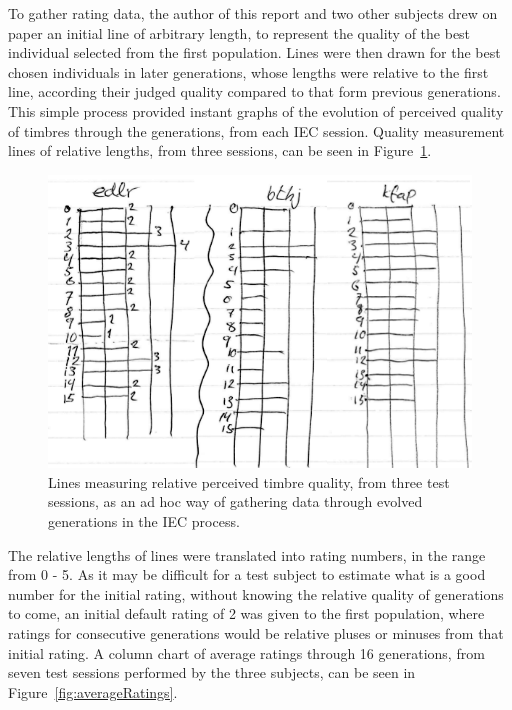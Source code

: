 \documentclass[conference]{IEEEtran}
\begin{document}
To gather rating data, the author of this report and two other subjects drew on paper an initial line of arbitrary length, to represent the quality of the best individual selected from the first population.  Lines were then drawn for the best chosen individuals in later generations, whose lengths were relative to the first line, according their judged quality compared to that form previous generations.  This simple process provided instant graphs of the evolution of perceived quality of timbres through the generations, from each IEC session.  Quality measurement lines of relative lengths, from three sessions, can be seen in Figure~\ref{fig:qualityLines}.

\begin{figure}[htp]
	\centerline{\includegraphics[width=1\columnwidth]{qualityMeasureLines.png}}
	\caption{Lines measuring relative perceived timbre quality, from three test sessions, as an ad hoc way of gathering data through evolved generations in the IEC process.}
	\label{fig:qualityLines}
\end{figure}

The relative lengths of lines were translated into rating numbers, in the range from 0 - 5.  As it may be difficult for a test subject to estimate what is a good number for the initial rating, without knowing the relative quality of generations to come, an initial default rating of 2 was given to the first population, where ratings for consecutive generations would be relative pluses or minuses from that initial rating.  A column chart of average ratings through 16 generations, from seven test sessions performed by the three subjects, can be seen in Figure~\ref{fig:averageRatings}.  
\end{document}
